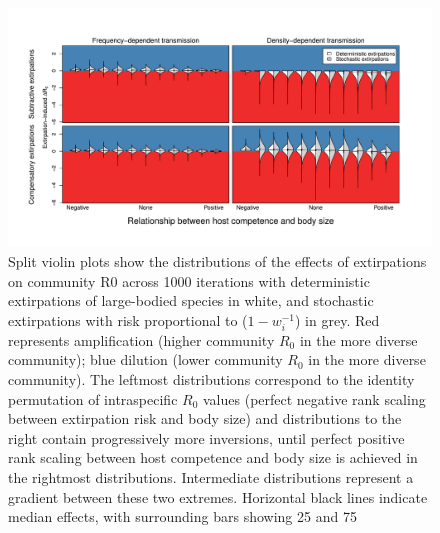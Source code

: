 \begin{figure}
	\caption[Effects of extirpation on disease risk]{
	Split violin plots show the distributions of the effects of extirpations on community R0 across 1000 iterations with deterministic extirpations of large-bodied species in white, and stochastic extirpations with risk proportional to ($1 − w_i^{−1}$) in grey. Red represents amplification (higher community $R_0$ in the more diverse community); blue dilution (lower community $R_0$ in the more diverse community). The leftmost distributions correspond to the identity permutation of intraspecific $R_0$ values (perfect negative rank scaling between extirpation risk and body size) and distributions to the right contain progressively more inversions, until perfect positive rank scaling between host competence and body size is achieved in the rightmost distributions. Intermediate distributions represent a gradient between these two extremes. Horizontal black lines indicate median effects, with surrounding bars showing 25 and 75%
	}
    \begin{center}
	\includegraphics[width=150mm]{figs/ch2/fig2.pdf}
    \end{center}
\label{2-2}
\end{figure}

